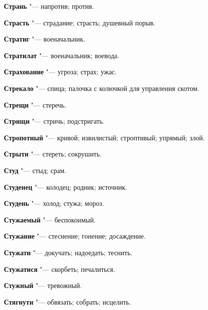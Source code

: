 \begin{mymulticols}{2}
\noindent\textbf{Странь} "--- напротив; против. 




\noindent\textbf{Страсть} "--- страдание; страсть; душевный порыв. 




\noindent\textbf{Стратиг} "--- военачальник. 




\noindent\textbf{Стратилат} "--- военачальник; воевода. 




\noindent\textbf{Страхование} "--- угроза; страх; ужас. 




\noindent\textbf{Стрекало} "--- спица; палочка с колючкой для управления скотом. 




\noindent\textbf{Стрещи} "--- стеречь. 




\noindent\textbf{Стрищи} "--- стричь; подстригать. 




\noindent\textbf{Стропотный} "--- кривой; извилистый; строптивый; упрямый; злой. 




\noindent\textbf{Стрыти} "--- стереть; сокрушить. 




\noindent\textbf{Студ} "--- стыд; срам. 




\noindent\textbf{Студенец} "--- колодец; родник; источник. 




\noindent\textbf{Студень} "--- холод; стужа; мороз. 




\noindent\textbf{Стужаемый} "--- беспокоимый. 




\noindent\textbf{Стужание} "--- стеснение; гонение; досаждение. 




\noindent\textbf{Стужати} "--- докучать; надоедать; теснить. 




\noindent\textbf{Стужатися} "--- скорбеть; печалиться. 




\noindent\textbf{Стужный} "--- тревожный. 




\noindent\textbf{Стягнути} "--- обвязать; собрать; исцелить. 





\end{mymulticols}
